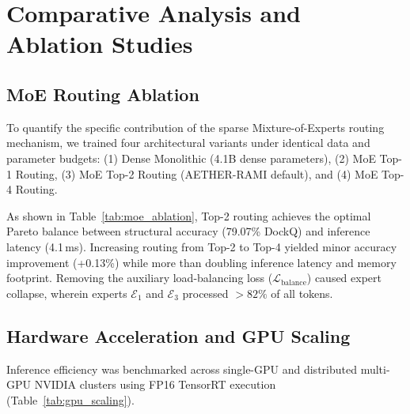 \documentclass[10pt,journal,compsoc]{IEEEtran}
\begin{document}
\section{Comparative Analysis and Ablation Studies}
\label{sec:comparative}

\subsection{MoE Routing Ablation}
To quantify the specific contribution of the sparse Mixture-of-Experts routing mechanism, we trained four architectural variants under identical data and parameter budgets: (1) Dense Monolithic (4.1B dense parameters), (2) MoE Top-1 Routing, (3) MoE Top-2 Routing (AETHER-RAMI default), and (4) MoE Top-4 Routing.

\begin{table}[h]
\caption{Architectural Ablation of Mixture-of-Experts Gating}
\label{tab:moe_ablation}
\centering
\small
{}
\end{table}

As shown in Table~\ref{tab:moe_ablation}, Top-2 routing achieves the optimal Pareto balance between structural accuracy (79.07\% DockQ) and inference latency (4.1\,ms). Increasing routing from Top-2 to Top-4 yielded minor accuracy improvement (+0.13\%) while more than doubling inference latency and memory footprint. Removing the auxiliary load-balancing loss ($\mathcal{L}_{\text{balance}}$) caused expert collapse, wherein experts $\mathcal{E}_1$ and $\mathcal{E}_3$ processed $>82\%$ of all tokens.

\subsection{Hardware Acceleration and GPU Scaling}
Inference efficiency was benchmarked across single-GPU and distributed multi-GPU NVIDIA clusters using FP16 TensorRT execution (Table~\ref{tab:gpu_scaling}).
\end{document}
